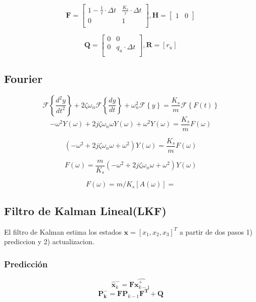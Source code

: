 \documentclass[conference]{IEEEtran}
\begin{document}
\[
	\mathbf{F} = \begin{bmatrix}
		1 -\frac{1}{\tau} \cdot \Delta t          & \frac{K_s}{\tau} \cdot \Delta t               \\
		0 & 1 \\
	\end{bmatrix},
	\mathbf{H} =
	\begin{bmatrix}
		1 & 0
	\end{bmatrix}
\]

\[
\mathbf{Q} = \begin{bmatrix}
	0 & 0  \\
	0 & q_u \cdot \Delta t \\
\end{bmatrix}, 
\mathbf{R} = [r_u]
\]



\subsection{Fourier}


\[
	\mathcal{F}\left\{ \frac{d^2y}{dt^2} \right\} + 2\zeta\omega_n \mathcal{F}\left\{\frac{dy}{dt}\right\} + \omega_n^2 \mathcal{F}\left\{y\right\} = \frac{K_s}{m} \mathcal{F}\left\{F(t)\right\}
\]
\[
	-\omega^2 Y(\omega)  + 2j\zeta\omega_n\omega Y(\omega) + \omega^2 Y(\omega) = \frac{K_s}{m}F(\omega)
\]
	
\[
	\left(-\omega^2  + 2j\zeta\omega_n\omega + \omega^2 \right) Y(\omega) = \frac{K_s}{m} F(\omega)
\]

\[
	F(\omega) = \frac{m}{K_s}  \left(-\omega^2  + 2j\zeta\omega_n\omega + \omega^2 \right) Y(\omega)
\]


\[
	 F(\omega) = m/K_s [A(\omega)] = 
\]

\subsection{Filtro de Kalman Lineal(LKF)}

El filtro de Kalman estima los estados $\textbf{x} = [x_1, x_2, x_3]^T$ a partir de dos pasos 1) prediccion y 2) actualizacion.



\subsubsection{Predicci\'on}


\[
\hat{\mathbf{x}}_k^- = \mathbf{F}\hat{\mathbf{x}^+_{k-1}}
\]
\[
\mathbf{P^-_k} = \mathbf{F} \mathbf{P}_{k-1} \mathbf{F^T} + \mathbf{Q}
\]
\end{document}
